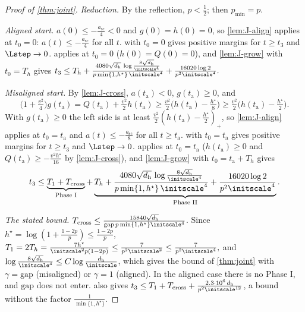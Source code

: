 \begin{proof}[Proof of \cref{thm:joint}]
\emph{Reduction.} By the reflection, $p<\frac{1}{2}$; then $p_{\min}=p$.

\emph{Aligned start.} $a(0)\le-\frac{a_{\mathrm{sc}}}{4}<0$ and $g(0)=h(0)=0$, so \cref{lem:J-align} applies at $t_0=0$: $a(t)\le-\frac{a_{\mathrm{sc}}}{4}$ for all $t$.
 with $t_0=0$ gives positive margins for $t\ge t_3$ and $\Lstep\to0$.  applies at $t_0=0$ ($h(0)=Q(0)=0$), and
\cref{lem:J-grow} with $t_0=T_h$ gives
 $t_3\le T_h+\frac{4080\sqrt{d_{\mathrm h}}\,\log\frac{8\sqrt{d_{\mathrm h}}}{\initscale^4}}{p\min\{1,h^\star\}\,\initscale^4}+\frac{16020\log 2}{p^2\initscale^4} .$ 

\emph{Misaligned start.} By \cref{lem:J-cross}, $a(t_{\mathrm a})<0$, $g(t_{\mathrm a})\ge0$, and
\[
 \bigl(1+\tfrac{v^2}{4}\bigr)g(t_{\mathrm a})=Q(t_{\mathrm a})+\tfrac{v^2}{2}h(t_{\mathrm a})\ge\tfrac{v^2}{2}\bigl(h(t_{\mathrm a})-\tfrac{h^\star}{8}\bigr)\ge\tfrac{v^2}{2}\bigl(h(t_{\mathrm a})-\tfrac{h^\star}{2}\bigr).
\]
With $g(t_{\mathrm a})\ge0$ the left side is at least $\frac{v^2}{2}(h(t_{\mathrm a})-\frac{h^\star}{2})_+$, so \cref{lem:J-align} applies at $t_0=t_{\mathrm a}$ and $a(t)\le-\frac{a_{\mathrm{sc}}}{8}$ for all $t\ge t_{\mathrm a}$.  with $t_0=t_{\mathrm a}$ gives positive margins for $t\ge t_3$ and $\Lstep\to0$. 
applies at $t_0=t_{\mathrm a}$ ($h(t_{\mathrm a})\ge0$ and $Q(t_{\mathrm a})\ge-\frac{v^2h^\star}{16}$ by \cref{lem:J-cross}), and \cref{lem:J-grow} with $t_0=t_{\mathrm a}+T_h$ gives
\[
 t_3\le\underbrace{T_1+T_{\mathrm{cross}}}_{\text{Phase I}}+\underbrace{T_h+\frac{4080\sqrt{d_{\mathrm h}}\,\log\frac{8\sqrt{d_{\mathrm h}}}{\initscale^4}}{p\min\{1,h^\star\}\,\initscale^4}+\frac{16020\log 2}{p^2\initscale^4}}_{\text{Phase II}} .
\]

\emph{The stated bound.} $T_{\mathrm{cross}}\le\frac{15840\sqrt{d_{\mathrm h}}}{\mathrm{gap}\,p\min\{1,h^\star\}\initscale^4}$. Since $h^\star=\log(1+\frac{1-2p}{p})\le\frac{1-2p}{p}$,
 $T_1=2T_h=\frac{7h^\star}{\initscale^2p(1-2p)}\le\frac{7}{p^2\initscale^2}\le\frac{7}{p^2\initscale^4},$ 
and $\log\frac{8\sqrt{d_{\mathrm h}}}{\initscale^4}\le C\log\frac{d_{\mathrm h}}{\initscale}$, which gives the bound of \cref{thm:joint} with $\gamma=\mathrm{gap}$ (misaligned) or $\gamma=1$ (aligned). In the
aligned case there is no Phase I, and $\mathrm{gap}$ does not enter.  also gives $t_3\le T_1+T_{\mathrm{cross}}+\frac{2.3\cdot10^6\,d_{\mathrm h}}{p^2\initscale^{12}}$, a bound
without the factor $\frac{1}{\min\{1,h^\star\}}$.


\end{proof}
